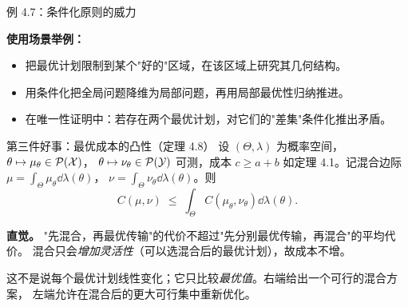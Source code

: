 \begin{frame}{例 4.7：条件化原则的威力}

  \textbf{使用场景举例：}
  \begin{itemize}
    \item 把最优计划限制到某个"好的"区域，在该区域上研究其几何结构。
    \item 用条件化把全局问题降维为局部问题，再用局部最优性归纳推进。
    \item 在唯一性证明中：若存在两个最优计划，对它们的"差集"条件化推出矛盾。
  \end{itemize}

\end{frame}

\begin{frame}{第三件好事：最优成本的凸性（定理 4.8）}
  设 $(\Theta,\lambda)$ 为概率空间，$\theta\mapsto\mu_{\theta}\in\mathcal{P}(\mathcal{X})$，
  $\theta\mapsto\nu_{\theta}\in\mathcal{P}(\mathcal{Y})$ 可测，成本 $c\ge a+b$ 如定理 4.1。记混合边际
  $\mu=\int_{\Theta}\mu_{\theta}\dd\lambda(\theta)$，
  $\nu=\int_{\Theta}\nu_{\theta}\dd\lambda(\theta)$。则
  \[
    C(\mu,\nu)
    \;\le\;
    \int_{\Theta} C(\mu_{\theta},\nu_{\theta})\dd\lambda(\theta).
  \]

  \textbf{直觉。} "先混合，再最优传输"的代价不超过"先分别最优传输，再混合"的平均代价。
  混合只会\emph{增加灵活性}（可以选混合后的最优计划），故成本不增。

   这不是说每个最优计划线性变化；它只比较\emph{最优值}。右端给出一个可行的混合方案，
  左端允许在混合后的更大可行集中重新优化。

\end{frame}

